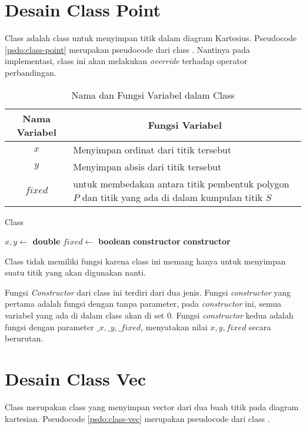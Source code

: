 \section{Desain Class Point}
\label{sec:point}
Class  adalah class untuk menyimpan titik dalam diagram Kartesius. Pseudocode \ref{psdo:class-point} merupakan pseudocode dari class . Nantinya pada implementasi, class ini akan melakukan \textit{override} terhadap operator perbandingan.
\begin{table}[]
	\Centering
	\begin{tabular}{|c|p{7cm}|}
	\hline
	Nama Variabel & \multicolumn{1}{c|}{Fungsi Variabel}                               \\ \hline
$x$           & Menyimpan ordinat dari titik tersebut  \\ \hline
$y$           & Menyimpan absis dari titik tersebut          \\ \hline
$fixed$             & untuk membedakan antara titik pembentuk polygon $P$ dan titik yang ada di dalam kumpulan titik $S$   \\ \hline
	\end{tabular}
	\caption{Nama dan Fungsi Variabel dalam Class }
	\label{tab:var-point}
\end{table}
\begin{algorithm}
	\caption{Class }
	\label{psdo:class-point}
	\begin{algorithmic}[1]
        \State $ x, y \leftarrow $ \textbf{double}
        \State $fixed \leftarrow $ \textbf{boolean}
		\State \textbf{constructor} 
        \State \textbf{constructor} 
	\end{algorithmic}
\end{algorithm}

Class  tidak memiliki fungsi karena class ini memang hanya untuk menyimpan suatu titik yang akan digunakan nanti.

Fungsi \textit{Constructor} dari class ini terdiri dari dua jenis. Fungsi \textit{constructor} yang pertama adalah fungsi dengan tanpa parameter, pada \textit{constructor} ini, semua variabel yang ada di dalam class  akan di set $0$. Fungsi \textit{constructor} kedua adalah fungsi dengan parameter $\_x, \_y, \_fixed$, menyatakan nilai $x, y, fixed$ secara berurutan.

\section{Desain Class Vec}
\label{sec:vec}
Class  merupakan class yang menyimpan vector dari dua buah titik pada diagram kartesian. Pseudocode \ref{psdo:class-vec} merupakan pseudocode dari class . 

